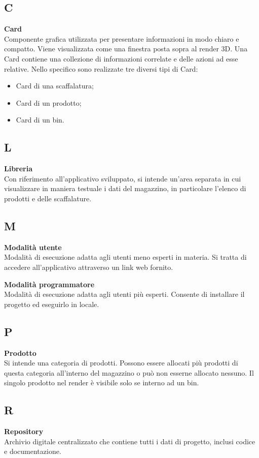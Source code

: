 \subsection*{C}
\textbf{Card}\\
Componente grafica utilizzata per presentare informazioni in modo chiaro e compatto. Viene visualizzata come una finestra posta sopra al render 3D. Una Card contiene una collezione di informazioni correlate e delle azioni ad esse relative. Nello specifico sono realizzate tre diversi tipi di Card:
\begin{itemize}
    \item Card di una scaffalatura;
    \item Card di un prodotto;
    \item Card di un bin.
\end{itemize}

\subsection*{L}
\textbf{Libreria}\\
Con riferimento all’applicativo sviluppato, si intende un’area separata in cui visualizzare in maniera testuale i dati del magazzino, in particolare l'elenco di prodotti e delle scaffalature.

\subsection*{M}
\textbf{Modalità utente}\\
Modalità di esecuzione adatta agli utenti meno esperti in materia. Si tratta di accedere all'applicativo attraverso un link web fornito.

\bigskip
\noindent \textbf{Modalità programmatore}\\
Modalità di esecuzione adatta agli utenti più esperti. Consente di installare il progetto ed eseguirlo in locale.

\subsection*{P}
\textbf{Prodotto}\\
Si intende una categoria di prodotti. Possono essere allocati più prodotti di questa categoria all'interno del magazzino o può non esserne allocato nessuno. Il singolo prodotto nel render è visibile solo se interno ad un bin.

\subsection*{R}
\textbf{Repository}\\
Archivio digitale centralizzato che contiene tutti i dati di progetto, inclusi codice e documentazione.

